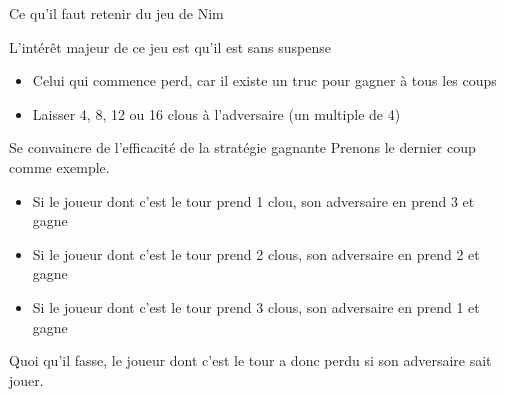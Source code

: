 \documentclass[final,hyperref={pdfpagelabels=false}]{beamer}
\begin{document}
\newcommand{\clou}[2]{\draw[#2] #1 -- +(.4,0) -- +(.2,0) -- +(.2,.5);}
\begin{frame}{Ce qu'il faut retenir du jeu de Nim}

  \begin{block}{L'intérêt majeur de ce jeu est qu'il est sans suspense}
    \begin{itemize}
    \item Celui qui commence perd, car il existe un truc pour gagner à tous
      les coups
    \item {} Laisser 4, 8, 12 ou 16 clous à
      l'adversaire (un multiple de 4)
    \end{itemize}
  \end{block}

  \begin{block}{Se convaincre de l'efficacité de la stratégie gagnante}
    Prenons le dernier coup comme exemple.
    \begin{itemize}
    \item Si le joueur dont c'est le tour prend 1 clou, son adversaire en prend
      3 et gagne
    \item Si le joueur dont c'est le tour prend 2 clous, son adversaire en
      prend 2 et gagne
    \item Si le joueur dont c'est le tour prend 3 clous, son adversaire en
      prend 1 et gagne 
    \end{itemize}
    Quoi qu'il fasse, le joueur dont c'est le tour a donc perdu si son
    adversaire sait jouer.
  \end{block}


\end{frame}
\end{document}
